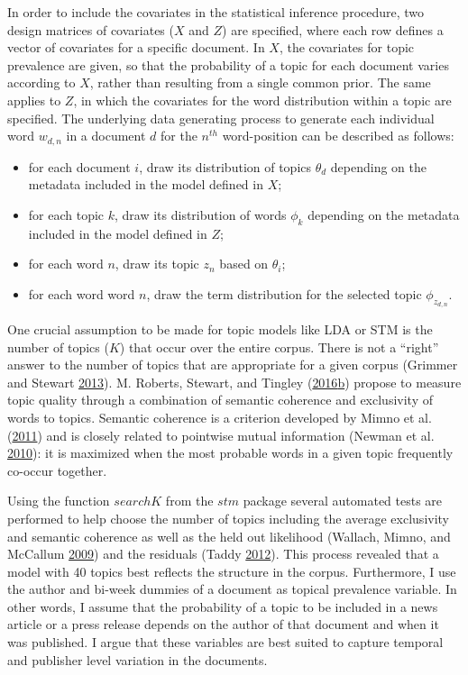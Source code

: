 \documentclass[
]{article}
\providecommand{\tightlist}{%
  \setlength{\itemsep}{0pt}\setlength{\parskip}{0pt}}
\begin{document}
In order to include the covariates in the statistical inference
procedure, two design matrices of covariates (\(X\) and \(Z\)) are
specified, where each row defines a vector of covariates for a specific
document. In \(X\), the covariates for topic prevalence are given, so
that the probability of a topic for each document varies according to
\(X\), rather than resulting from a single common prior. The same
applies to \(Z\), in which the covariates for the word distribution
within a topic are specified. The underlying data generating process to
generate each individual word \(w_{d,n}\) in a document \(d\) for the
\(n^{th}\) word-position can be described as follows:

\begin{itemize}
\tightlist
\item
  for each document \(i\), draw its distribution of topics \(\theta_d\)
  depending on the metadata included in the model defined in \(X\);
\item
  for each topic \(k\), draw its distribution of words \(\phi_k\)
  depending on the metadata included in the model defined in \(Z\);
\item
  for each word \(n\), draw its topic \(z_n\) based on \(\theta_i\);
\item
  for each word word \(n\), draw the term distribution for the selected
  topic \(\phi_{z_{d,n}}\).
\end{itemize}

One crucial assumption to be made for topic models like LDA or STM is
the number of topics (\(K\)) that occur over the entire corpus. There is
not a ``right'' answer to the number of topics that are appropriate for
a given corpus (Grimmer and Stewart
\protect\hyperlink{ref-grimmer_text_2013}{2013}). M. Roberts, Stewart,
and Tingley
(\protect\hyperlink{ref-roberts_stm:_2016}{2016}\protect\hyperlink{ref-roberts_stm:_2016}{b})
propose to measure topic quality through a combination of semantic
coherence and exclusivity of words to topics. Semantic coherence is a
criterion developed by Mimno et al.
(\protect\hyperlink{ref-mimno_optimizing_2011}{2011}) and is closely
related to pointwise mutual information (Newman et al.
\protect\hyperlink{ref-newman_automatic_2010}{2010}): it is maximized
when the most probable words in a given topic frequently co-occur
together.

Using the function \(searchK\) from the \(stm\) package several
automated tests are performed to help choose the number of topics
including the average exclusivity and semantic coherence as well as the
held out likelihood (Wallach, Mimno, and McCallum
\protect\hyperlink{ref-wallach_rethinking_2009}{2009}) and the residuals
(Taddy \protect\hyperlink{ref-taddy_estimation_2012}{2012}). This
process revealed that a model with 40 topics best reflects the structure
in the corpus. Furthermore, I use the author and bi-week dummies of a
document as topical prevalence variable. In other words, I assume that
the probability of a topic to be included in a news article or a press
release depends on the author of that document and when it was
published. I argue that these variables are best suited to capture
temporal and publisher level variation in the documents.
\end{document}
